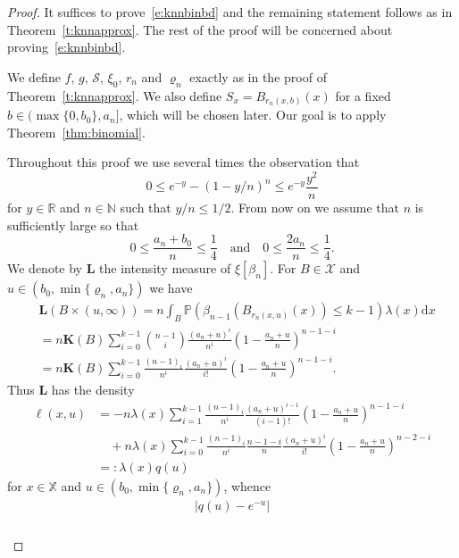 \documentclass[AHL,Unicode,longabstracts]{cedram}
\newcommand*\bL{\mathbf{L}}
\newcommand*\bK{\mathbf{K}}
\newcommand*\N{\mathbb{N}}
\newcommand*\R{\mathbb{R}}
\renewcommand*\P{\mathbb{P}}
\newcommand*\X{\mathbb{X}}
\newcommand*\cS{\mathcal{S}}
\newcommand*\cX{\mathcal{X}}
\newcommand*\md{\mathrm{d}}
\newcommand{\prob}[1]{\P\left(#1\right)}
\begin{document}
\begin{proof}
It suffices to prove~\eqref{e:knnbinbd} and the remaining statement follows as in Theorem~\ref{t:knnapprox}. The rest of the proof will be concerned about proving~\eqref{e:knnbinbd}.

We define $f$, $g$, $\cS$, $\xi_0$, $r_n$ and $\varrho_n$ exactly as in the proof of Theorem~\ref{t:knnapprox}. We also define $S_x=B_{r_n(x,b)}(x)$ for a fixed $b\in(\max\{0,b_0\},a_n {]}$, which will be chosen later. Our goal is to apply Theorem~\ref{thm:binomial}.

Throughout this proof we use several times the observation that
\begin{equation}\label{e:ApproximationExponential}
0 \leq e^{-y} - (1-y/n)^n \leq e^{-y} \frac{y^2}{n}
\end{equation}
for $y\in\R$ and $n\in\N$ such that $y/n\leq 1/2$. From now on we assume that $n$ is sufficiently large so that
\begin{equation}\label{e:Assumption_a_n}
0 \leq \frac{a_n+b_0}{n} \leq \frac{1}{4} \quad \text{and} \quad 0\leq \frac{2 a_n}{n}\leq \frac{1}{4}.
\end{equation}
We denote by $\bL$ the intensity measure of $\xi[\beta_n]$. For $B\in\cX$ and $u\in(b_0,\min\{\varrho_n,a_n\})$ we have
\begin{align*}
& \bL(B\times(u,\infty)) = n \int_B \prob{\beta_{n-1}\left(B_{r_n(x,u)}(x)\right)\leq k-1} \lambda(x) \md x \\
& = n \bK(B) \sum_{i=0}^{k-1} \binom{n-1}{i} \frac{(a_n+u)^i}{n^i} \left(1 - \frac{a_n+u}{n} \right)^{n-1-i} \\&= n \bK(B) \sum_{i=0}^{k-1} \frac{(n-1)_i}{n^i} \frac{(a_n+u)^i}{i!} \left(1 - \frac{a_n+u}{n} \right)^{n-1-i}.
\end{align*}
Thus $\bL$ has the density
\begin{align*}
\ell(x,u) & = -n \lambda(x)\sum_{i=1}^{k-1} \frac{(n-1)_i}{n^i} \frac{(a_n+u)^{i-1}}{(i-1)!} \left(1 - \frac{a_n+u}{n} \right)^{n-1-i} \\ & \quad + n \lambda(x) \sum_{i=0}^{k-1} \frac{(n-1)_i}{n^i} \frac{n-1-i}{n} \frac{(a_n+u)^i}{i!} \left(1 - \frac{a_n+u}{n} \right)^{n-2-i} \\
& =: \lambda(x) q(u)
\end{align*}
for $x\in\X$ and $u\in(b_0,\min\{\varrho_n,a_n\})$, whence
\begin{multline*}
\left|q(u) - e^{-u}\right|\\
\begin{aligned}

\end{aligned}
\end{multline*}
\end{proof}
\end{document}
